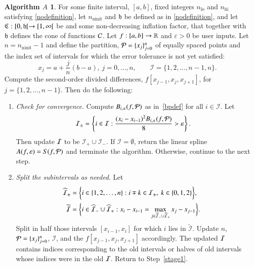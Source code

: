 \documentclass[review]{elsarticle}
\newcommand{\abstol}{\varepsilon}
\theoremstyle{definition}
\newtheorem*{algoA}{Algorithm $A$}
\DeclareMathOperator{\lo}{lo}
\DeclareMathOperator{\ninit}{ninit}
\begin{document}
\begin{algoA} \label{AlgoA}
For some finite interval, $[a,b]$,  fixed integers $n_{\lo}$ and $n_{\text{hi}}$ satisfying \eqref{nodefinition}, let $n_{\ninit}$ and $\mathfrak{h}$ be defined as in \eqref{nodefinition}, and let  $\mathfrak{C}:[0,\mathfrak{h}[ \to [1, \infty[$ be and some non-decreasing inflation factor, that together with $\mathfrak{h}$ defines the cone of functions $\mathcal{C}$.  Let $f:[a,b] \to \mathbb{R}$ and $\abstol >0$ be
user inputs.  Let  $n=n_{\ninit}-1$ and define the partition, $\mathcal{P} = \{x_j\}_{j=0}^n$ of  equally spaced points and the index set of intervals for which the error tolerance
is not yet satisfied:
$$x_j=a+\frac{j}{n}(b-a), \ j=0,\ldots,n, \qquad
\mathcal{I} = \{1,2,\ldots,n-1,n\}.$$
Compute the second-order divided differences, $f[x_{j-1},
x_{j}, x_{j+1}]$, for $j= \{1,2,\ldots,n-1\}$. Then do the
following:
\begin{enumerate}[\em Step 1.]%

\item \label{stage1} \emph{Check for convergence.}
Compute $B_{i,\pm}(f,\mathcal{P})$ as in~\eqref{bpdef} for all $i \in \mathcal{I}$.
Let
\[
\mathcal{I}_\pm = \left\{i \in \mathcal{I}: \frac{(x_i - x_{i-1})^2B_{i,\pm}(f,\cp)}{8}  > \abstol \right\}.
\]
Then update $\mathcal{I}$ to be $\mathcal{I}_+ \cup \mathcal{I}_-$.  If $\mathcal{I} = \emptyset$, return the linear spline $A(f,\abstol) = S(f, \cp)$ and terminate the algorithm.
Otherwise, continue to the next step.

\item \label{stage2} \emph{Split the subintervals as needed.}
Let
\begin{gather*}
\widehat{\mathcal{I}}_{\pm} = \biggl\{i \in \{1,2,\ldots,n\}: i\mp k \in \mathcal{I}_{\pm}, \ k \in \{0,1,2\}   \biggr\}, \quad  \\
\widetilde{\mathcal{I}}=\biggl\{i \in \widehat{\mathcal{I}}_- \cup \widehat{\mathcal{I}}_+ : x_i - x_{i-1}=\max\limits_{j \in \widehat{\mathcal{I}}_- \cup \widehat{\mathcal{I}}_+ } x_j-x_{j-1} \biggr\}.
\end{gather*}
Split in half those intervals $[x_{i-1},x_i]$ for which $i$ lies in $\widetilde{\mathcal{I}}$.
Update $n$, $\mathcal{P} = \{x_j\}_{j=0}^n$, $\mathcal{I}$, and the $f[x_{j-1}, x_{j}, x_{j+1}]$ accordingly.  The updated $\mathcal{I}$ contains  indices corresponding to the old intervals or halves of old intervals whose indices were in the old $\mathcal{I}$.  Return to Step~\ref{stage1}.
\end{enumerate}
\end{algoA}
\end{document}
